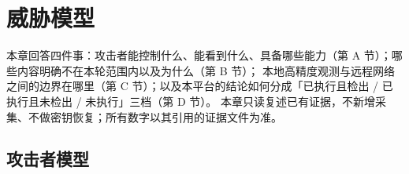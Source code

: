 %

\section{威胁模型}

本章回答四件事：攻击者能控制什么、能看到什么、具备哪些能力（第 A 节）；哪些内容明确不在本轮范围内以及为什么（第 B 节）；
本地高精度观测与远程网络之间的边界在哪里（第 C 节）；以及本平台的结论如何分成「已执行且检出 / 已执行且未检出 / 未执行」三档（第 D 节）。
本章只读复述已有证据，不新增采集、不做密钥恢复；所有数字以其引用的证据文件为准。

\subsection{攻击者模型}

